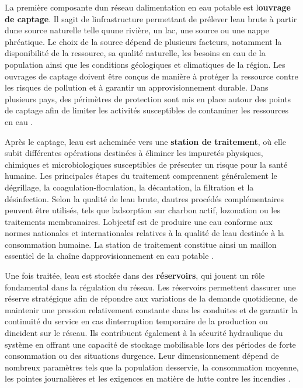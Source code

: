 \documentclass[12pt,a4paper,oneside]{report}
\begin{document}
La première composante d\textquotesingle un réseau
d\textquotesingle alimentation en eau potable est
l\textquotesingle{}\textbf{ouvrage de captage}. Il
s\textquotesingle agit de l\textquotesingle infrastructure permettant de
prélever l\textquotesingle eau brute à partir d\textquotesingle une
source naturelle telle qu\textquotesingle une rivière, un lac, une
source ou une nappe phréatique. Le choix de la source dépend de
plusieurs facteurs, notamment la disponibilité de la ressource, sa
qualité naturelle, les besoins en eau de la population ainsi que les
conditions géologiques et climatiques de la région. Les ouvrages de
captage doivent être conçus de manière à protéger la ressource contre
les risques de pollution et à garantir un approvisionnement durable.
Dans plusieurs pays, des périmètres de protection sont mis en place
autour des points de captage afin de limiter les activités susceptibles
de contaminer les ressources en eau \cite{ref4}.

Après le captage, l\textquotesingle eau est acheminée vers une
\textbf{station de traitement}, où elle subit différentes opérations
destinées à éliminer les impuretés physiques, chimiques et
microbiologiques susceptibles de présenter un risque pour la santé
humaine. Les principales étapes du traitement comprennent généralement
le dégrillage, la coagulation-floculation, la décantation, la filtration
et la désinfection. Selon la qualité de l\textquotesingle eau brute,
d\textquotesingle autres procédés complémentaires peuvent être utilisés,
tels que l\textquotesingle adsorption sur charbon actif,
l\textquotesingle ozonation ou les traitements membranaires.
L\textquotesingle objectif est de produire une eau conforme aux normes
nationales et internationales relatives à la qualité de
l\textquotesingle eau destinée à la consommation humaine. La station de
traitement constitue ainsi un maillon essentiel de la chaîne
d\textquotesingle approvisionnement en eau potable \cite{ref33}.

Une fois traitée, l\textquotesingle eau est stockée dans des
\textbf{réservoirs}, qui jouent un rôle fondamental dans la régulation
du réseau. Les réservoirs permettent d\textquotesingle assurer une
réserve stratégique afin de répondre aux variations de la demande
quotidienne, de maintenir une pression relativement constante dans les
conduites et de garantir la continuité du service en cas
d\textquotesingle interruption temporaire de la production ou
d\textquotesingle incident sur le réseau. Ils contribuent également à la
sécurité hydraulique du système en offrant une capacité de stockage
mobilisable lors des périodes de forte consommation ou des situations
d\textquotesingle urgence. Leur dimensionnement dépend de nombreux
paramètres tels que la population desservie, la consommation moyenne,
les pointes journalières et les exigences en matière de lutte contre les
incendies \cite{ref34}.
\end{document}
